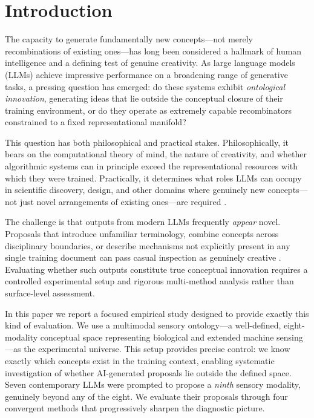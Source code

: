 \documentclass[pdflatex,sn-mathphys-num]{sn-jnl}
\begin{document}
\section{Introduction}
\label{sec:intro}

The capacity to generate fundamentally new concepts---not merely recombinations of existing
ones---has long been considered a hallmark of human intelligence and a defining test of genuine
creativity.  As large language models (LLMs) achieve impressive performance on a broadening
range of generative tasks, a pressing question has emerged: do these systems exhibit
\emph{ontological innovation}, generating ideas that lie outside the conceptual closure of their
training environment, or do they operate as extremely capable recombinators constrained to a
fixed representational manifold?

This question has both philosophical and practical stakes.  Philosophically, it bears on the
computational theory of mind, the nature of creativity, and whether algorithmic systems can in
principle exceed the representational resources with which they were trained.  Practically, it
determines what roles LLMs can occupy in scientific discovery, design, and other domains where
genuinely new concepts---not just novel arrangements of existing ones---are required
\cite{kuhn1962structure}.

The challenge is that outputs from modern LLMs frequently \emph{appear} novel.  Proposals that
introduce unfamiliar terminology, combine concepts across disciplinary boundaries, or describe
mechanisms not explicitly present in any single training document can pass casual inspection as
genuinely creative \cite{wiggins2006preliminary,colton2012computational}.  Evaluating whether
such outputs constitute true conceptual innovation requires a controlled experimental setup and
rigorous multi-method analysis rather than surface-level assessment.

In this paper we report a focused empirical study designed to provide exactly this kind of
evaluation.  We use a multimodal sensory ontology---a well-defined, eight-modality conceptual
space representing biological and extended machine sensing---as the experimental universe.
This setup provides precise control: we know exactly which concepts exist in the training
context, enabling systematic investigation of whether AI-generated proposals lie outside the
defined space.  Seven contemporary LLMs were prompted to propose a \emph{ninth} sensory
modality, genuinely beyond any of the eight.  We evaluate their proposals through four
convergent methods that progressively sharpen the diagnostic picture.
\end{document}
